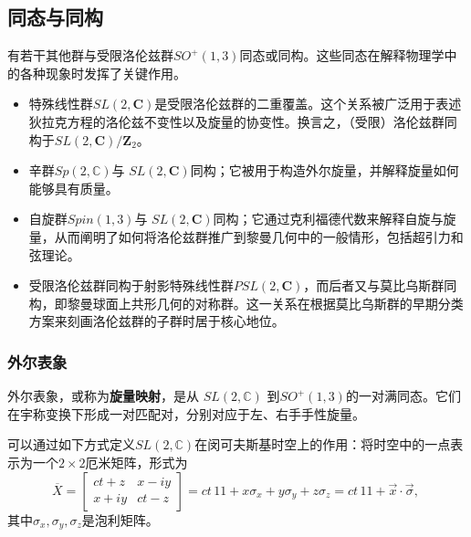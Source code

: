 \subsection{同态与同构}
有若干其他群与受限洛伦兹群$SO^{+}(1,3)$同态或同构。这些同态在解释物理学中的各种现象时发挥了关键作用。
\begin{itemize}
  \item 特殊线性群$SL(2,\mathbf{C})$是受限洛伦兹群的二重覆盖。这个关系被广泛用于表述狄拉克方程的洛伦兹不变性以及旋量的协变性。换言之，（受限）洛伦兹群同构于$SL(2,\mathbf{C}) / \mathbf{Z}_{2}$。
  \item 辛群$Sp(2,\mathbb{C})$与 $SL(2,\mathbf{C})$同构；它被用于构造外尔旋量，并解释旋量如何能够具有质量。
  \item 自旋群$Spin(1,3)$与 $SL(2,\mathbf{C})$同构；它通过克利福德代数来解释自旋与旋量，从而阐明了如何将洛伦兹群推广到黎曼几何中的一般情形，包括超引力和弦理论。
  \item 受限洛伦兹群同构于射影特殊线性群$PSL(2,\mathbf{C})$，而后者又与莫比乌斯群同构，即黎曼球面上共形几何的对称群。这一关系在根据莫比乌斯群的早期分类方案来刻画洛伦兹群的子群时居于核心地位。
\end{itemize}
\subsubsection{外尔表象}
外尔表象，或称为\textbf{旋量映射}，是从 $SL(2,\mathbb{C})$ 到$SO^{+}(1,3)$的一对满同态。它们在宇称变换下形成一对匹配对，分别对应于左、右手手性旋量。

可以通过如下方式定义$SL(2,\mathbb{C})$在闵可夫斯基时空上的作用：将时空中的一点表示为一个$2\times 2$厄米矩阵，形式为
\[
\overline{X} =
\begin{bmatrix}
ct+z & x - i y \\
x + i y & ct - z
\end{bmatrix}
= ct\,1\!\!1 + x\sigma_{x} + y\sigma_{y} + z\sigma_{z}
= ct\,1\!\!1 + \vec{x}\cdot\vec{\sigma},~
\]
其中$\sigma_{x}, \sigma_{y}, \sigma_{z}$是泡利矩阵。
